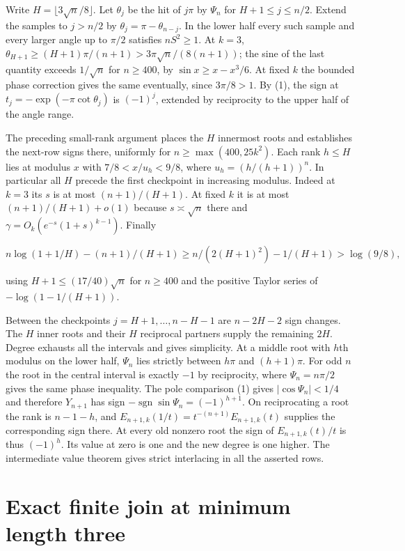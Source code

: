 \documentclass[11pt]{article}
\begin{document}
Write $H=\lfloor3\sqrt n/8\rfloor$. Let $\theta_j$ be the hit of $j\pi$ by $\Psi_n$ for $H+1\le j\le n/2$. Extend the samples to $j>n/2$ by $\theta_j=\pi-\theta_{n-j}$. In the lower half every such sample and every larger angle up to $\pi/2$ satisfies $nS^2\ge1$. At $k=3$, $\theta_{H+1}\ge(H+1)\pi/(n+1)>3\pi\sqrt n/(8(n+1))$; the sine of the last quantity exceeds $1/\sqrt n$ for $n\ge400$, by $\sin x\ge x-x^3/6$. At fixed $k$ the bounded phase correction gives the same eventually, since $3\pi/8>1$. By (1), the sign at $t_j=-\exp(-\pi\cot\theta_j)$ is $(-1)^j$, extended by reciprocity to the upper half of the angle range.

The preceding small-rank argument places the $H$ innermost roots and establishes the next-row signs there, uniformly for $n\ge\max(400,25k^2)$. Each rank $h\le H$ lies at modulus $x$ with $7/8<x/u_h<9/8$, where $u_h=(h/(h+1))^n$. In particular all $H$ precede the first checkpoint in increasing modulus. Indeed at $k=3$ its $s$ is at most $(n+1)/(H+1)$. At fixed $k$ it is at most $(n+1)/(H+1)+o(1)$ because $s\asymp\sqrt n$ there and $\gamma=O_k(e^{-s}(1+s)^{k-1})$. Finally

\[
 n\log(1+1/H)-(n+1)/(H+1)\ge n/(2(H+1)^2)-1/(H+1)>\log(9/8),
\]

using $H+1\le(17/40)\sqrt n$ for $n\ge400$ and the positive Taylor series of $-\log(1-1/(H+1))$.

Between the checkpoints $j=H+1,\ldots,n-H-1$ are $n-2H-2$ sign changes. The $H$ inner roots and their $H$ reciprocal partners supply the remaining $2H$. Degree exhausts all the intervals and gives simplicity. At a middle root with $h$th modulus on the lower half, $\Psi_n$ lies strictly between $h\pi$ and $(h+1)\pi$. For odd $n$ the root in the central interval is exactly $-1$ by reciprocity, where $\Psi_n=n\pi/2$ gives the same phase inequality. The pole comparison (1) gives $|\cos\Psi_n|<1/4$ and therefore $Y_{n+1}$ has sign $-\operatorname{sgn}\sin\Psi_n=(-1)^{h+1}$. On reciprocating a root the rank is $n-1-h$, and $E_{n+1,k}(1/t)=t^{-(n+1)}E_{n+1,k}(t)$ supplies the corresponding sign there. At every old nonzero root the sign of $E_{n+1,k}(t)/t$ is thus $(-1)^h$. Its value at zero is one and the new degree is one higher. The intermediate value theorem gives strict interlacing in all the asserted rows.

\section{Exact finite join at minimum length three}
\end{document}
